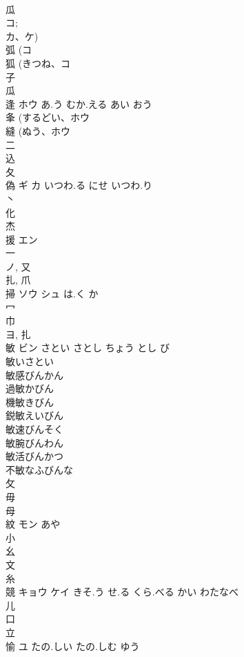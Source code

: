 \documentclass[8pt]{extreport}
\begin{document}
\begin{CJK}{UTF8}{min}
\\	瓜 
\\	コ; 
\\	カ、ケ) 
\\	弧 (コ 
\\	狐 (きつね、コ 
\\	子 
\\	瓜 
\\	逢	ホウ	あ.う むか.える あい おう	
\\	夆 (するどい、ホウ 
\\	縫 (ぬう、ホウ 
\\	二 
\\	込 
\\	夂 
\\	偽	ギ カ	いつわ.る にせ いつわ.り	
\\	丶 
\\	化 
\\	杰	
\\	援	エン		
\\	一 
\\	ノ, 又 
\\	扎, 爪 
\\	掃	ソウ シュ	は.く か	
\\	冖 
\\	巾 
\\	ヨ, 扎	
\\	敏	ビン	さとい さとし ちょう とし び	
\\	敏いさとい
\\	敏感びんかん
\\	過敏かびん
\\	機敏きびん
\\	鋭敏えいびん
\\	敏速びんそく
\\	敏腕びんわん
\\	敏活びんかつ
\\	不敏なふびんな
\\	攵 
\\	毋 
\\	母 
\\	紋	モン	あや	
\\	小 
\\	幺 
\\	文 
\\	糸 
\\	競	キョウ ケイ	きそ.う せ.る くら.べる かい わたなべ	
\\	儿 
\\	口 
\\	立 
\\	愉	ユ	たの.しい たの.しむ ゆう	

\end{CJK}
\end{document}
